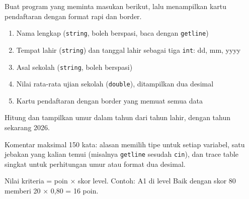 \documentclass[a4paper]{article}
\begin{document}
Buat program yang meminta masukan berikut, lalu menampilkan kartu pendaftaran dengan format rapi dan border.
\begin{enumerate}
\item Nama lengkap (\texttt{string}, boleh berspasi, baca dengan \texttt{getline})
\item Tempat lahir (\texttt{string}) dan tanggal lahir sebagai tiga \texttt{int}: dd, mm, yyyy
\item Asal sekolah (\texttt{string}, boleh berspasi)
\item Nilai rata-rata ujian sekolah (\texttt{double}), ditampilkan dua desimal
\item Kartu pendaftaran dengan border yang memuat semua data
\end{enumerate}
\begin{Contoh}
Hitung dan tampilkan umur dalam tahun dari tahun lahir, dengan tahun sekarang 2026.
\end{Contoh}
Komentar maksimal 150 kata: alasan memilih tipe untuk setiap variabel, satu jebakan yang kalian temui (misalnya \texttt{getline} sesudah \texttt{cin}), dan trace table singkat untuk perhitungan umur atau format dua desimal.

\par\vspace{4pt}\par\vspace{6pt}
Nilai kriteria = poin × skor level. Contoh: A1 di level Baik dengan skor 80 memberi 20 × 0,80 = 16 poin.
\end{document}
